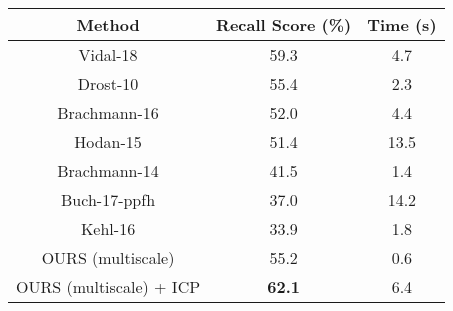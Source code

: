\documentclass[letterpaper, 10 pt, conference]{ieeeconf}  %
\begin{document}
    \centering
        \begin{adjustbox}{center, margin=0 0 0 20px}
        \begin{tabular}{|c|c|c|}
        \hline
        \textbf{Method} & \textbf{Recall Score (\%)} & \textbf{Time (s)}\\
        \hline
        Vidal-18 \cite{vidal20186d} & 59.3 & 4.7 \\
        Drost-10 \cite{drost2010model} & 55.4 & 2.3 \\
        Brachmann-16 \cite{brachmann2016uncertainty} & 52.0 & 4.4 \\
        Hodan-15 \cite{hodavn2015detection} & 51.4 & 13.5 \\
        Brachmann-14 \cite{brachmann2014learning} & 41.5 & 1.4 \\
        Buch-17-ppfh \cite{buch2017rotational} & 37.0 & 14.2 \\
        Kehl-16 \cite{kehl2016deep} & 33.9 & 1.8 \\
        \hline
        OURS (multiscale) & 55.2 & 0.6 \\
        OURS (multiscale) + ICP & \textbf{62.1} & 6.4 \\
        \hline
        \end{tabular}
        \end{adjustbox}
        \label{table_vsd}
        \vspace{-0.25cm}
\end{document}
